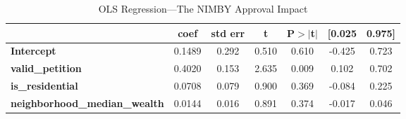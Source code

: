 \begin{table}[h]
\centering
\caption{OLS Regression---The NIMBY Approval Impact}
\label{tab:ols_results}
\begin{center}
\begin{tabular}{lcccccc}
\toprule
                                      & \textbf{coef} & \textbf{std err} & \textbf{t} & \textbf{P$> |$t$|$} & \textbf{[0.025} & \textbf{0.975]}  \\
\midrule
\textbf{Intercept}                    &       0.1489  &        0.292     &     0.510  &         0.610        &       -0.425    &        0.723     \\
\textbf{valid\_petition}              &       0.4020  &        0.153     &     2.635  &         0.009        &        0.102    &        0.702     \\
\textbf{is\_residential}              &       0.0708  &        0.079     &     0.900  &         0.369        &       -0.084    &        0.225     \\
\textbf{neighborhood\_median\_wealth} &       0.0144  &        0.016     &     0.891  &         0.374        &       -0.017    &        0.046     \\
\bottomrule
\end{tabular}
\end{center}\end{table}
